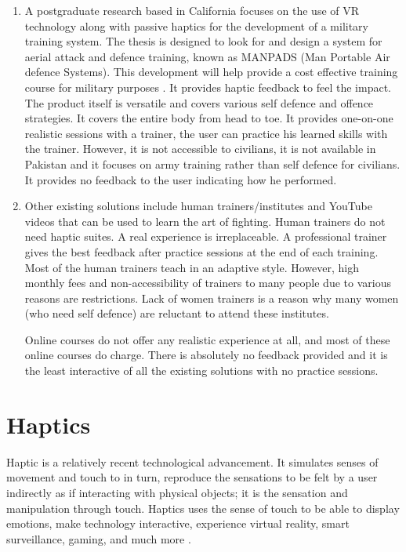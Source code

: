 \begin{enumerate}
    \item A postgraduate research based in California focuses on the use of VR technology along with passive haptics for the development of a military training system. The thesis is designed to look for and design a system for aerial attack and defence training, known as MANPADS (Man Portable Air defence Systems). This development will help provide a cost effective training course for military purposes \cite{manpads}. It provides haptic feedback to feel the impact. The product itself is versatile and covers various self defence and offence strategies. It covers the entire body from head to toe. It provides one-on-one realistic sessions with a trainer, the user can practice his learned skills with the trainer. However, it is not accessible to civilians, it is not available in Pakistan and it focuses on army training rather than self defence for civilians. It provides no feedback to the user indicating how he performed. 
    
    \item Other existing solutions include human trainers/institutes and YouTube videos that can be used to learn the art of fighting. Human trainers do not need haptic suites. A real experience is irreplaceable. A professional trainer gives the best feedback after practice sessions at the end of each training. Most of the human trainers teach in an adaptive style. However, high monthly fees and non-accessibility of trainers to many people due to various reasons are restrictions. Lack of women trainers is a reason why many women (who need self defence) are reluctant to attend these institutes. 
    
    Online courses do not offer any realistic experience at all, and most of these online courses do charge. There is absolutely no feedback provided and it is the least interactive of all the existing solutions with no practice sessions.
\end{enumerate}

\section{Haptics}
Haptic is a relatively recent technological advancement. It simulates senses of movement and touch to in turn, reproduce the sensations to be felt by a user indirectly as if interacting with physical objects; it is the sensation and manipulation through touch. Haptics uses the sense of touch to be able to display emotions, make technology interactive, experience virtual reality, smart surveillance, gaming, and much more \cite{affHaptics}. 


